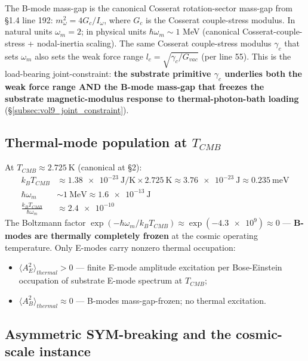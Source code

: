 The B-mode mass-gap is the canonical Cosserat rotation-sector mass-gap from  \S 1.4 line 192: $m_\omega^2 = 4 G_c / I_\omega$, where $G_c$ is the Cosserat couple-stress modulus. In natural units $\omega_m = 2$; in physical units $\hbar\omega_m \sim 1$ MeV (canonical Cosserat-couple-stress + nodal-inertia scaling). The same Cosserat couple-stress modulus $\gamma_c$ that sets $\omega_m$ also sets the weak force range $l_c = \sqrt{\gamma_c/G_{vac}}$ (per  line 55). This is the load-bearing joint-constraint: \textbf{the substrate primitive $\gamma_c$ underlies both the weak force range AND the B-mode mass-gap that freezes the substrate magnetic-modulus response to thermal-photon-bath loading} (\S\ref{subsec:vol9_joint_constraint}).

\subsection{Thermal-mode population at $T_{CMB}$}
\label{subsec:vol9_thermal_population}

At $T_{CMB} \approx \qty{2.725}{\kelvin}$ (canonical at  \S 2):
\begin{align}
k_B T_{CMB} &\approx \qty{1.38e-23}{\joule\per\kelvin} \times \qty{2.725}{\kelvin} \approx \qty{3.76e-23}{\joule} \approx \qty{0.235}{\milli\electronvolt} \\
\hbar\omega_m &\sim \qty{1}{\mega\electronvolt} \approx \qty{1.6e-13}{\joule} \\
\frac{k_B T_{CMB}}{\hbar\omega_m} &\approx \num{2.4e-10}
\end{align}
The Boltzmann factor $\exp(-\hbar\omega_m / k_B T_{CMB}) \approx \exp(-\num{4.3e9}) \approx 0$ --- \textbf{B-modes are thermally completely frozen} at the cosmic operating temperature. Only E-modes carry nonzero thermal occupation:
\begin{itemize}
    \item $\langle A_E^2 \rangle_{thermal} > 0$ --- finite E-mode amplitude excitation per Bose-Einstein occupation of substrate E-mode spectrum at $T_{CMB}$;
    \item $\langle A_B^2 \rangle_{thermal} \approx 0$ --- B-modes mass-gap-frozen; no thermal excitation.
\end{itemize}

\subsection{Asymmetric SYM-breaking and the cosmic-scale instance}
\label{subsec:vol9_asym_sym_breaking}


